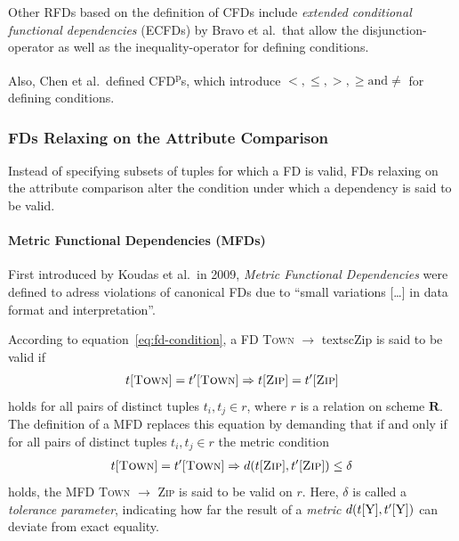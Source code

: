 Other RFDs based on the definition of CFDs include \emph{extended conditional functional dependencies} (ECFDs) by Bravo et al.\ that allow the disjunction-operator as well as the inequality-operator for defining conditions.\cite{BRA08}

Also, Chen et al.\ defined CFD\textsuperscript{p}s, which introduce \( <, \leq, >, \geq \text{and} \neq \) for defining conditions.\cite{CHE09}

\subsubsection{FDs Relaxing on the Attribute Comparison}
Instead of specifying subsets of tuples for which a FD is valid, FDs relaxing on the attribute comparison alter the condition under which a dependency is said to be valid.

\paragraph{Metric Functional Dependencies (MFDs)}
First introduced by Koudas et al.\ in 2009, \emph{Metric Functional Dependencies} were defined to adress violations of canonical FDs due to ``small variations [\dots] in data format and interpretation''.\cite[p.~1]{KOU09}

According to equation~\ref{eq:fd-condition}, a FD \textsc{Town} \( \to\) textsc{Zip} is said to be valid if
\begin{align}
    t[\textsc{Town}] = t'[\textsc{Town}] \Rightarrow t[\textsc{Zip}] = t'[\textsc{Zip}]
\end{align}
holds for all pairs of distinct tuples \( t_i, t_j \in r \), where \( r \) is a relation on scheme \( \boldsymbol{R} \).
The definition of a MFD replaces this equation by demanding that if and only if for all pairs of distinct tuples \( t_i, t_j \in r \) the metric condition
\begin{align}\label{eq:mfd-condition}
    t[\textsc{Town}] = t'[\textsc{Town}] \Rightarrow d(t[\textsc{Zip}], t'[\textsc{Zip}]) \leq \delta
\end{align}
holds, the MFD \textsc{Town} \( \to\) \textsc{Zip} is said to be valid on \( r \).\cite[p.~2]{KOU09}
Here, \( \delta \) is called a \emph{tolerance parameter}, indicating how far the result of a \emph{metric} \( d(t[\textsc{Y}], t'[\textsc{Y}]) \) can deviate from exact equality.

